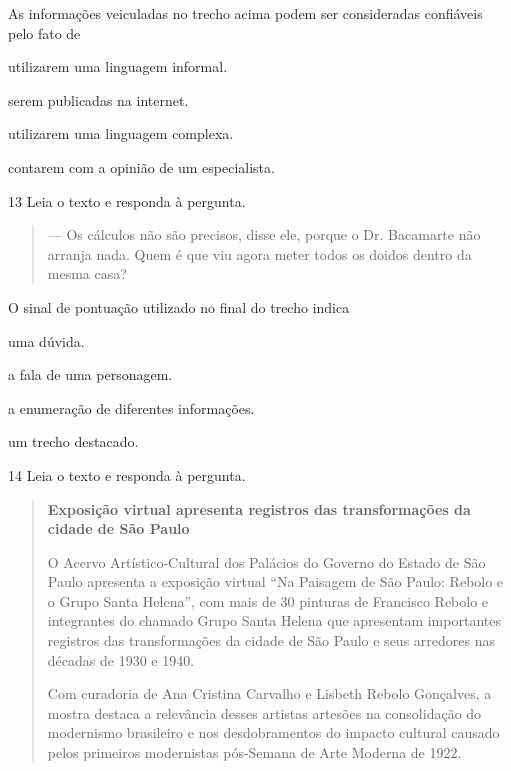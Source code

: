As informações veiculadas no trecho acima podem ser consideradas
confiáveis pelo fato de

\begin{escolha}
  \item utilizarem uma linguagem informal.

  \item serem publicadas na internet.

  \item utilizarem uma linguagem complexa.

  \item contarem com a opinião de um especialista.
\end{escolha}

\num{13} Leia o texto e responda à pergunta.

\begin{quote}
--- Os cálculos não são precisos, disse ele, porque o Dr. Bacamarte não
arranja nada. Quem é que viu agora meter todos os doidos dentro da mesma
casa?

\end{quote}

O sinal de pontuação utilizado no final do trecho indica

\begin{escolha}
  \item uma dúvida.

  \item a fala de uma personagem.

  \item a enumeração de diferentes informações.

  \item um trecho destacado.
\end{escolha}

\num{14} Leia o texto e responda à pergunta.

\begin{quote}
\textbf{Exposição virtual apresenta registros das transformações 
da cidade de São Paulo}

O Acervo Artístico-Cultural dos Palácios do Governo do Estado de São
Paulo apresenta a exposição virtual ``Na Paisagem de São Paulo: Rebolo e
o Grupo Santa Helena'', com mais de 30 pinturas de Francisco Rebolo e
integrantes do chamado Grupo Santa Helena que apresentam importantes
registros das transformações da cidade de São Paulo e seus arredores nas
décadas de 1930 e 1940.

Com curadoria de Ana Cristina Carvalho e Lisbeth Rebolo Gonçalves, a
mostra destaca a relevância desses artistas artesões na consolidação do
modernismo brasileiro e nos desdobramentos do impacto cultural causado
pelos primeiros modernistas pós-Semana de Arte Moderna de 1922.

\end{quote}

